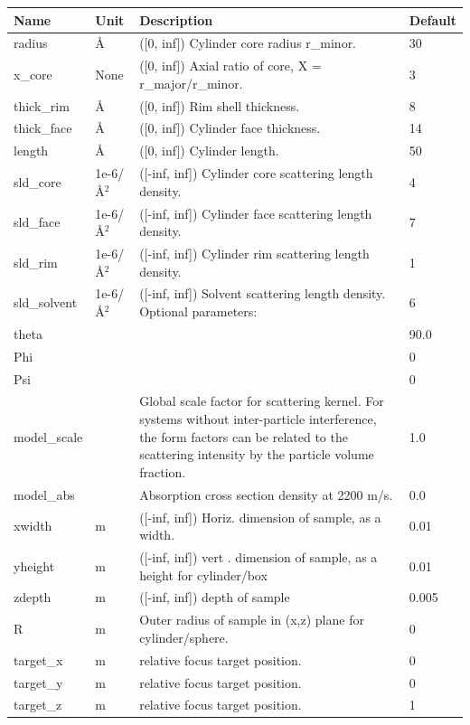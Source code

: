 \begin{longtable}{p{}p{}p{}p{}}
\toprule
\textbf{Name} & \textbf{Unit} & \textbf{Description} & \textbf{Default} \\
\midrule
\endhead
radius & \AA{} & ([0, inf]) Cylinder core radius r\_minor. & 30 \\
x\_core & None & ([0, inf]) Axial ratio of core, X = r\_major/r\_minor. & 3 \\
thick\_rim & \AA{} & ([0, inf]) Rim shell thickness. & 8 \\
thick\_face & \AA{} & ([0, inf]) Cylinder face thickness. & 14 \\
length & \AA{} & ([0, inf]) Cylinder length. & 50 \\
sld\_core & 1e-6/\AA{}$^{2}$ & ([-inf, inf]) Cylinder core scattering length density. & 4 \\
sld\_face & 1e-6/\AA{}$^{2}$ & ([-inf, inf]) Cylinder face scattering length density. & 7 \\
sld\_rim & 1e-6/\AA{}$^{2}$ & ([-inf, inf]) Cylinder rim scattering length density. & 1 \\
sld\_solvent & 1e-6/\AA{}$^{2}$ & ([-inf, inf]) Solvent scattering length density. Optional parameters: & 6 \\
theta &  &  & 90.0 \\
Phi &  &  & 0 \\
Psi &  &  & 0 \\
model\_scale &   & Global scale factor for scattering kernel. For systems without inter-particle interference, the form factors can be related to the scattering intensity by the particle volume fraction. & 1.0 \\
model\_abs &   & Absorption cross section density at 2200 m/s. & 0.0 \\
xwidth & m & ([-inf, inf]) Horiz. dimension of sample, as a width. & 0.01 \\
yheight & m & ([-inf, inf]) vert . dimension of sample, as a height for cylinder/box & 0.01 \\
zdepth & m & ([-inf, inf]) depth of sample & 0.005 \\
R & m & Outer radius of sample in (x,z) plane for cylinder/sphere. & 0 \\
target\_x & m & relative focus target position. & 0 \\
target\_y & m & relative focus target position. & 0 \\
target\_z & m & relative focus target position. & 1 \\

\end{longtable}
